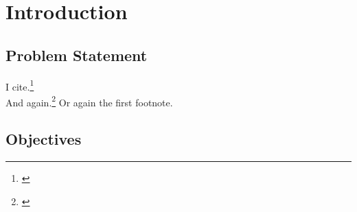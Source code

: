 \section{Introduction}
\subsection{Problem Statement}
I cite.\footnote{\cite{Chang.2014}\label{Chang_2014}}\\
And again.\footnote{\cite{Dunser.2012}} Or again the first footnote.
\subsection{Objectives}